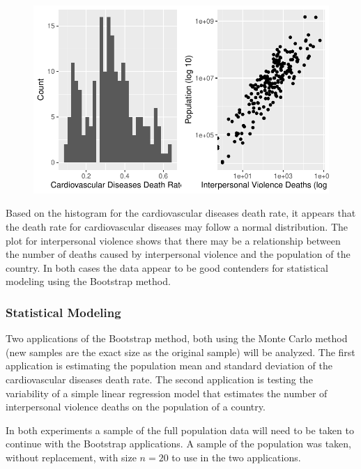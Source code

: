\documentclass[
  letterpaper,
  DIV=11,
  numbers=noendperiod]{scrartcl}
\begin{document}
\begin{figure}[H]

{\centering \includegraphics{Bootstrapping-Group-Report_files/figure-pdf/unnamed-chunk-8-1.pdf}

}

\end{figure}

Based on the histogram for the cardiovascular diseases death rate, it
appears that the death rate for cardiovascular diseases may follow a
normal distribution. The plot for interpersonal violence shows that
there may be a relationship between the number of deaths caused by
interpersonal violence and the population of the country. In both cases
the data appear to be good contenders for statistical modeling using the
Bootstrap method.

\hypertarget{statistical-modeling}{%
\subsubsection{Statistical Modeling}\label{statistical-modeling}}

Two applications of the Bootstrap method, both using the Monte Carlo
method (new samples are the exact size as the original sample) will be
analyzed. The first application is estimating the population mean and
standard deviation of the cardiovascular diseases death rate. The second
application is testing the variability of a simple linear regression
model that estimates the number of interpersonal violence deaths on the
population of a country.

In both experiments a sample of the full population data will need to be
taken to continue with the Bootstrap applications. A sample of the
population was taken, without replacement, with size \(n = 20\) to use
in the two applications.
\end{document}
